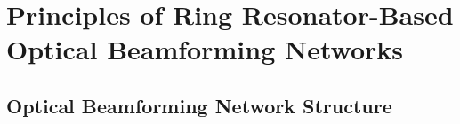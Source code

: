 %
\chapter{Principles of Ring Resonator-Based Optical Beamforming Networks}

\section{Optical Beamforming Network Structure}

